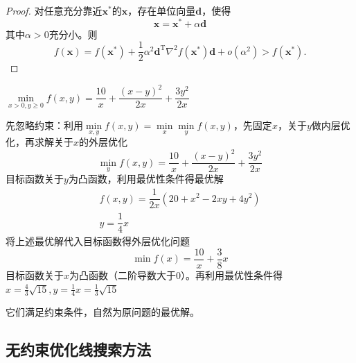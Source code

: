 \begin{proof}
    对任意充分靠近$\boldsymbol{x}^*$的$\boldsymbol{x}$，存在单位向量$\boldsymbol{d}$，使得
    \[
        \boldsymbol{x} = \boldsymbol{x}^*+\alpha\boldsymbol{d}   
    \]
    其中$\alpha>0$充分小。则
    \[
        f(\boldsymbol{x})=f(\boldsymbol{x}^{*})+\frac{1}{2}\alpha^{2}\boldsymbol{d}^{\mathrm{T}}\nabla^{2}f(\boldsymbol{x}^{*})\boldsymbol{d}+o(\alpha^{2})>f(\boldsymbol{x}^{*}).
    \]
\end{proof}
\begin{example}
    $\min\limits_{x>0,y\geqslant 0}f(x,y)=\dfrac{10}{x}+\dfrac{(x-y)^{2}}{2x}+\dfrac{3y^{2}}{2x}$\quad {}

    先忽略约束：利用$\min\limits_{x,y}f(x,y)=\min\limits_x\min\limits_yf(x,y)$，先固定$x$，关于$y$做内层优化，再求解关于$x$的外层优化
    \[
        \min\limits_{y}f(x,y)=\frac{10}{x}+\frac{(x-y)^{2}}{2x}+\frac{3y^{2}}{2x}
    \]
    目标函数关于$y$为凸函数，利用最优性条件得最优解
    \[
        \begin{array}{c}
            f(x,y)=\dfrac{1}{2x}\left( 20+x^2-2xy+4y^2 \right)\\
            y = \dfrac{1}{4}x
        \end{array}
    \]
    将上述最优解代入目标函数得外层优化问题
    \[
        \min f(x)=\dfrac{10}{x}+\dfrac{3}{8}x
    \]
    目标函数关于$x$为凸函数（二阶导数大于0）。再利用最优性条件得$x=\frac43\sqrt{15},y=\frac{1}{4}x=\frac{1}{3}\sqrt{15}$

    它们满足约束条件，自然为原问题的最优解。
\end{example}

\subsection{无约束优化线搜索方法}
